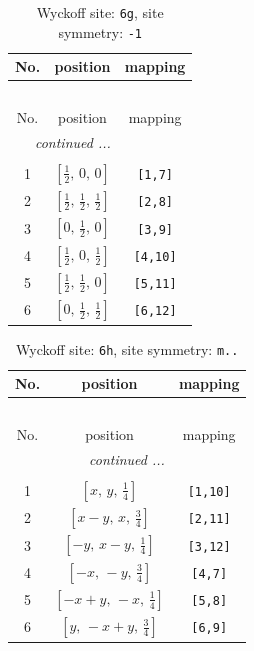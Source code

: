 \documentclass[fleqn,8pt]{jsarticle}
\begin{document}
\renewcommand{\arraystretch}{1.2}
\begin{longtable}{ccc}
\caption{Wyckoff site: {\tt 6g}, site symmetry: {\tt -1}}
 \\
 \hline \hline
No. & position & mapping \\ \hline \endfirsthead

\multicolumn{2}{l}{\tablename\ \thetable{}} \\
 \hline \hline
No. & position & mapping \\ \hline \endhead

 \hline \hline
\multicolumn{2}{r}{\footnotesize\it continued ...} \\ \endfoot

 \hline \hline
\multicolumn{2}{r}{} \\ \endlastfoot

1 & $\left[ \frac{1}{2},\, 0,\, 0 \right]$ & {\tt [1,7]} \\ \hline
2 & $\left[ \frac{1}{2},\, \frac{1}{2},\, \frac{1}{2} \right]$ & {\tt [2,8]} \\ \hline
3 & $\left[ 0,\, \frac{1}{2},\, 0 \right]$ & {\tt [3,9]} \\ \hline
4 & $\left[ \frac{1}{2},\, 0,\, \frac{1}{2} \right]$ & {\tt [4,10]} \\ \hline
5 & $\left[ \frac{1}{2},\, \frac{1}{2},\, 0 \right]$ & {\tt [5,11]} \\ \hline
6 & $\left[ 0,\, \frac{1}{2},\, \frac{1}{2} \right]$ & {\tt [6,12]} \\
\end{longtable}
\renewcommand{\arraystretch}{1.2}
\begin{longtable}{ccc}
\caption{Wyckoff site: {\tt 6h}, site symmetry: {\tt m..}}
 \\
 \hline \hline
No. & position & mapping \\ \hline \endfirsthead

\multicolumn{2}{l}{\tablename\ \thetable{}} \\
 \hline \hline
No. & position & mapping \\ \hline \endhead

 \hline \hline
\multicolumn{2}{r}{\footnotesize\it continued ...} \\ \endfoot

 \hline \hline
\multicolumn{2}{r}{} \\ \endlastfoot

1 & $\left[ x,\, y,\, \frac{1}{4} \right]$ & {\tt [1,10]} \\ \hline
2 & $\left[ x - y,\, x,\, \frac{3}{4} \right]$ & {\tt [2,11]} \\ \hline
3 & $\left[ - y,\, x - y,\, \frac{1}{4} \right]$ & {\tt [3,12]} \\ \hline
4 & $\left[ - x,\, - y,\, \frac{3}{4} \right]$ & {\tt [4,7]} \\ \hline
5 & $\left[ - x + y,\, - x,\, \frac{1}{4} \right]$ & {\tt [5,8]} \\ \hline
6 & $\left[ y,\, - x + y,\, \frac{3}{4} \right]$ & {\tt [6,9]} \\
\end{longtable}
\end{document}
